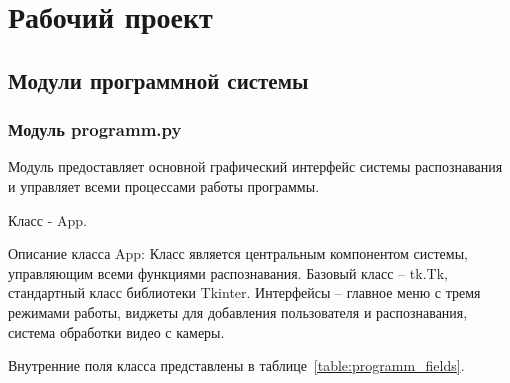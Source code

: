 \section{Рабочий проект}

\subsection{Модули программной системы}

\subsubsection{Модуль programm.py}

Модуль предоставляет основной графический интерфейс системы распознавания и управляет всеми процессами работы программы.

Класс - App.

Описание класса App:
Класс является центральным компонентом системы, управляющим всеми функциями распознавания. Базовый класс -- tk.Tk, стандартный класс библиотеки Tkinter. Интерфейсы -- главное меню с тремя режимами работы, виджеты для добавления пользователя и распознавания, система обработки видео с камеры.

Внутренние поля класса представлены в таблице~\ref{table:programm_fields}.

